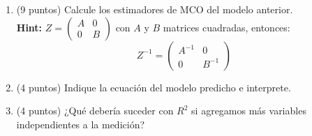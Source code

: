 \documentclass[10pt,a4paper]{article}
\begin{document}
\begin{enumerate}
\begin{enumerate}
        \item (9 puntos) Calcule los estimadores de MCO del modelo anterior.\\
        \textbf{Hint:} \( Z = \begin{pmatrix} A & 0 \\ 0 & B \end{pmatrix} \) con \( A \) y \( B \) matrices cuadradas, entonces:\[Z^{-1} = \begin{pmatrix} A^{-1} & 0 \\ 0 & B^{-1} \end{pmatrix}\]

        \item (4 puntos) Indique la ecuación del modelo predicho e interprete.

        \item (4 puntos) ¿Qué debería suceder con $R^2$ si agregamos más variables independientes a la medición?
        
    \end{enumerate}

\end{enumerate}
\end{document}
